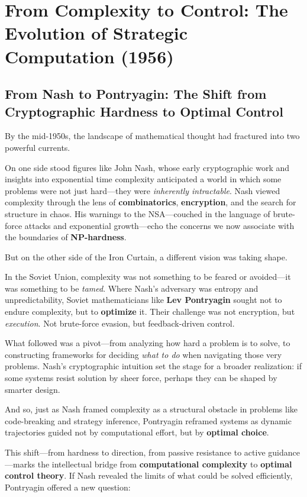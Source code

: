 \section{From Complexity to Control: The Evolution of Strategic Computation (1956)}

\subsection{From Nash to Pontryagin: The Shift from Cryptographic Hardness to Optimal Control}

By the mid-1950s, the landscape of mathematical thought had fractured into two powerful currents.

On one side stood figures like John Nash, whose early cryptographic work and insights into exponential time complexity anticipated a world in which some problems were not just hard—they were \emph{inherently intractable}. Nash viewed complexity through the lens of \textbf{combinatorics}, \textbf{encryption}, and the search for structure in chaos. His warnings to the NSA—couched in the language of brute-force attacks and exponential growth—echo the concerns we now associate with the boundaries of \textbf{NP-hardness}.

But on the other side of the Iron Curtain, a different vision was taking shape.

In the Soviet Union, complexity was not something to be feared or avoided—it was something to be \emph{tamed}. Where Nash’s adversary was entropy and unpredictability, Soviet mathematicians like \textbf{Lev Pontryagin} sought not to endure complexity, but to \textbf{optimize} it. Their challenge was not encryption, but \textit{execution}. Not brute-force evasion, but feedback-driven control.

What followed was a pivot—from analyzing how hard a problem is to solve, to constructing frameworks for deciding \textit{what to do} when navigating those very problems. Nash’s cryptographic intuition set the stage for a broader realization: if some systems resist solution by sheer force, perhaps they can be shaped by smarter design.

And so, just as Nash framed complexity as a structural obstacle in problems like code-breaking and strategy inference, Pontryagin reframed systems as dynamic trajectories guided not by computational effort, but by \textbf{optimal choice}.

This shift—from hardness to direction, from passive resistance to active guidance—marks the intellectual bridge from \textbf{computational complexity} to \textbf{optimal control theory}. If Nash revealed the limits of what could be solved efficiently, Pontryagin offered a new question:

